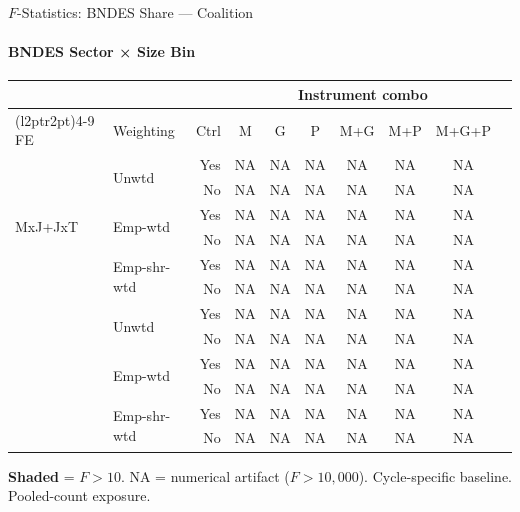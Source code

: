 \documentclass[aspectratio=169,10pt]{beamer}
\begin{document}
\begin{frame}[t]{$F$-Statistics: BNDES Share --- Coalition}
\framesubtitle{BNDES Sector × Size Bin}
\begin{center}
\footnotesize
\setlength{\tabcolsep}{3.5pt}
\renewcommand{\arraystretch}{1.05}
\begin{tabular}{@{}llrccccccc@{}}
\toprule
 & & & \multicolumn{6}{c}{Instrument combo} \\
\cmidrule(l{2pt}r{2pt}){4-9}
FE & Weighting & Ctrl & M & G & P & M+G & M+P & M+G+P \\
\midrule
  \multirow{6}{*}{MxJ+JxT} & \multirow{2}{*}{Unwtd} & Yes & NA & NA & NA & NA & NA & NA \\
   &  & No & NA & NA & NA & NA & NA & NA \\
   & \multirow{2}{*}{Emp-wtd} & Yes & NA & NA & NA & NA & NA & NA \\
   &  & No & NA & NA & NA & NA & NA & NA \\
   & \multirow{2}{*}{Emp-shr-wtd} & Yes & NA & NA & NA & NA & NA & NA \\
   &  & No & NA & NA & NA & NA & NA & NA \\
\addlinespace[5pt]
  \multirow{6}{*}{MxJ+MxT} & \multirow{2}{*}{Unwtd} & Yes & NA & NA & NA & NA & NA & NA \\
   &  & No & NA & NA & NA & NA & NA & NA \\
   & \multirow{2}{*}{Emp-wtd} & Yes & NA & NA & NA & NA & NA & NA \\
   &  & No & NA & NA & NA & NA & NA & NA \\
   & \multirow{2}{*}{Emp-shr-wtd} & Yes & NA & NA & NA & NA & NA & NA \\
   &  & No & NA & NA & NA & NA & NA & NA \\
\bottomrule
\end{tabular}
\end{center}
{\scriptsize \colorbox{pass}{\textbf{Shaded}} = $F>10$. NA = numerical artifact ($F>10{,}000$). Cycle-specific baseline. Pooled-count exposure.}
\end{frame}
\end{document}
